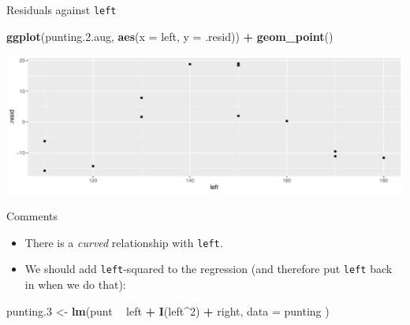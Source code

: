 \documentclass[
  ignorenonframetext,
]{beamer}
\newenvironment{Shaded}{\begin{snugshade}}{\end{snugshade}}
\newcommand{\DataTypeTok}[1]{\textcolor[rgb]{0.13,0.29,0.53}{#1}}
\newcommand{\DecValTok}[1]{\textcolor[rgb]{0.00,0.00,0.81}{#1}}
\newcommand{\FloatTok}[1]{\textcolor[rgb]{0.00,0.00,0.81}{#1}}
\newcommand{\KeywordTok}[1]{\textcolor[rgb]{0.13,0.29,0.53}{\textbf{#1}}}
\newcommand{\NormalTok}[1]{#1}
\newcommand{\OperatorTok}[1]{\textcolor[rgb]{0.81,0.36,0.00}{\textbf{#1}}}
\newcommand{\StringTok}[1]{\textcolor[rgb]{0.31,0.60,0.02}{#1}}
\begin{document}
\begin{frame}[fragile]{Residuals against \texttt{left}}
\protect\hypertarget{residuals-against-left}{}

\begin{Shaded}
\begin{Highlighting}[]
\KeywordTok{ggplot}\NormalTok{(punting.}\FloatTok{2.}\NormalTok{aug, }\KeywordTok{aes}\NormalTok{(}\DataTypeTok{x =}\NormalTok{ left, }\DataTypeTok{y =}\NormalTok{ .resid)) }\OperatorTok{+}
\StringTok{  }\KeywordTok{geom_point}\NormalTok{()}
\end{Highlighting}
\end{Shaded}

\includegraphics{slides_d29_files/figure-beamer/basingstoke-1.pdf}

\end{frame}

\begin{frame}[fragile]{Comments}
\protect\hypertarget{comments-9}{}

\begin{itemize}
\item
  There is a \emph{curved} relationship with \texttt{left}.
\item
  We should add \texttt{left}-squared to the regression (and therefore
  put \texttt{left} back in when we do that):
\end{itemize}

\begin{Shaded}
\begin{Highlighting}[]
\NormalTok{punting}\FloatTok{.3}\NormalTok{ <-}\StringTok{ }\KeywordTok{lm}\NormalTok{(punt }\OperatorTok{~}\StringTok{ }\NormalTok{left }\OperatorTok{+}\StringTok{ }\KeywordTok{I}\NormalTok{(left}\OperatorTok{^}\DecValTok{2}\NormalTok{) }\OperatorTok{+}\StringTok{ }\NormalTok{right,}
  \DataTypeTok{data =}\NormalTok{ punting}
\NormalTok{)}
\end{Highlighting}
\end{Shaded}

\end{frame}
\end{document}
